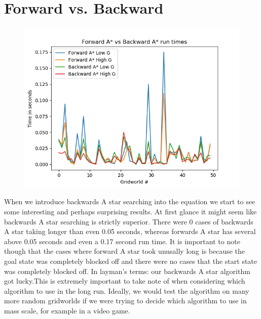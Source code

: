 \documentclass[12pt]{article}
\begin{document}
\section*{Forward vs. Backward}
	\begin{figure}[!htb]
		\centering
		\includegraphics[width=.8\textwidth]{forward_vs_backward.png}
	\end{figure}
When we introduce backwards A star searching into the equation we start to see some interesting and perhaps surprising results. At first glance it might seem like backwards A star searching is strictly superior. There were 0 cases of backwards A star taking longer than even 0.05 seconds, whereas forwards A star has several above 0.05 seconds and even a 0.17 second run time. It is important to note though that the cases where forward A star took unusally long is because the goal state was completely blocked off and there were no cases that the start state was completely blocked off. In layman's terms: our backwards A star algorithm got lucky.This is extremely important to take note of when considering which algorithm to use in the long run. Ideally, we would test the algorithm on many more random gridworlds if we were trying to decide which algorithm to use in mass scale, for example in a video game.
\newpage
\end{document}
